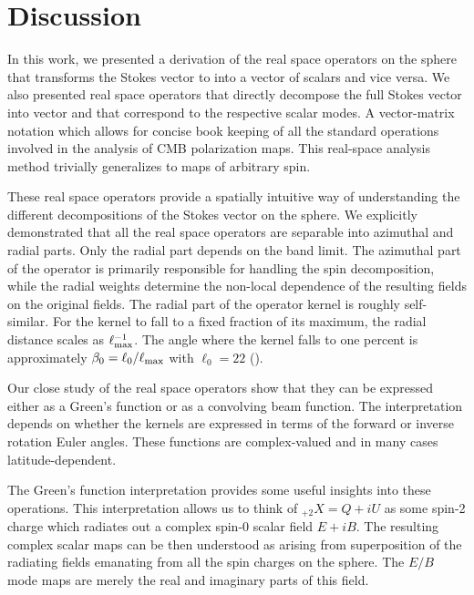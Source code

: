 \section{Discussion}\label{sec:discussion}
In this work, we presented a  derivation of the real space operators on the sphere that transforms the Stokes vector to into a vector of scalars and vice versa. We also presented real space operators that directly decompose the full Stokes vector \vp{} into vector  and  that correspond to the respective scalar modes.  A vector-matrix notation which allows for concise book keeping of all the standard operations involved in the analysis of CMB polarization maps. This real-space analysis method trivially generalizes to maps of arbitrary spin.


These real space operators provide a spatially intuitive way of understanding the different decompositions of the Stokes vector on the sphere. We explicitly  demonstrated that all the real space operators are separable into azimuthal and radial parts.  Only the radial part depends on the band limit.  The azimuthal part of the operator is primarily responsible for handling the spin decomposition, while the radial weights determine the non-local dependence of the resulting fields on the original fields.
The radial part of the operator kernel is roughly self-similar.  For the kernel to fall to a fixed fraction of its maximum, the radial distance scales as $\ell_{\rm max}^{-1}$.  The angle where the kernel falls to one percent is approximately $\beta_0 = \ell_{0}/\ell_{\rm max}$ with $\ell_{0}=22$ ().

Our close study of the real space operators show that they can be expressed either as a Green's function or as a convolving beam function.  The interpretation  depends on whether the kernels are expressed in terms of the forward or inverse rotation Euler angles.  These functions are complex-valued and in many cases latitude-dependent.

The Green's function interpretation provides some useful insights into these operations. This interpretation allows us to think of ${}_{+2}X=Q+iU$ as some spin-2 charge which radiates out a complex spin-0 scalar field $E+iB$. The resulting complex scalar maps can be then understood as arising from superposition of the radiating fields emanating from all the spin charges on the sphere.  The $E/B$ mode maps are merely the real and imaginary parts of this field.  


